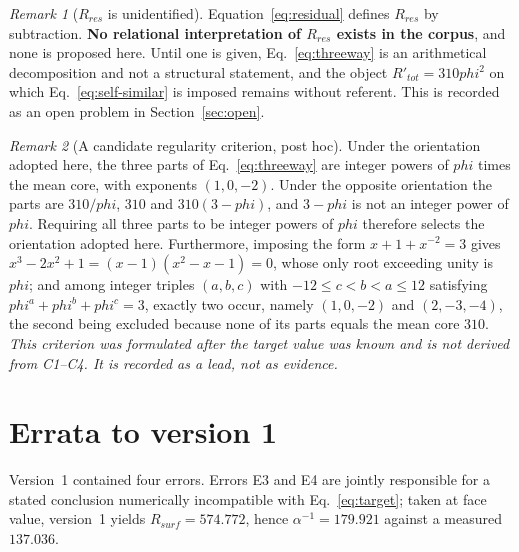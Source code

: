 \documentclass[11pt,a4paper]{article}
\def\varphi{phi}%
\def\mathrm#1{#1}%
\theoremstyle{definition}
\theoremstyle{plain}
\theoremstyle{remark}
\newtheorem{remark}{Remark}
\newcommand{\Rsurf}{R_{\mathrm{surf}}}
\newcommand{\Rres}{R_{\mathrm{res}}}
\begin{document}
\begin{remark}[$\Rres$ is unidentified]
\label{rem:residual}
Equation~\eqref{eq:residual} defines $\Rres$ by subtraction. \textbf{No relational interpretation of $\Rres$ exists in the corpus}, and none is proposed here. Until one is given, Eq.~\eqref{eq:threeway} is an arithmetical decomposition and not a structural statement, and the object $R'_{\mathrm{tot}} = 310\varphi^2$ on which Eq.~\eqref{eq:self-similar} is imposed remains without referent. This is recorded as an open problem in Section~\ref{sec:open}.
\end{remark}

\begin{remark}[A candidate regularity criterion, post hoc]
\label{rem:regularity}
Under the orientation adopted here, the three parts of Eq.~\eqref{eq:threeway} are integer powers of $\varphi$ times the mean core, with exponents $(1,0,-2)$. Under the opposite orientation the parts are $310/\varphi$, $310$ and $310(3-\varphi)$, and $3-\varphi$ is not an integer power of $\varphi$. Requiring all three parts to be integer powers of $\varphi$ therefore selects the orientation adopted here. Furthermore, imposing the form $x + 1 + x^{-2} = 3$ gives $x^3 - 2x^2 + 1 = (x-1)(x^2-x-1) = 0$, whose only root exceeding unity is $\varphi$; and among integer triples $(a,b,c)$ with $-12 \le c < b < a \le 12$ satisfying $\varphi^a + \varphi^b + \varphi^c = 3$, exactly two occur, namely $(1,0,-2)$ and $(2,-3,-4)$, the second being excluded because none of its parts equals the mean core $310$. \emph{This criterion was formulated after the target value was known and is not derived from C1--C4. It is recorded as a lead, not as evidence.}
\end{remark}

\section{Errata to version 1}
\label{sec:errata}

Version~1 \citep{PDL_D05v1} contained four errors. Errors E3 and E4 are jointly responsible for a stated conclusion numerically incompatible with Eq.~\eqref{eq:target}; taken at face value, version~1 yields $\Rsurf = 574.772$, hence $\alpha^{-1} = 179.921$ against a measured $137.036$.
\end{document}
